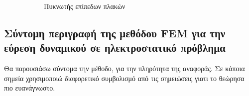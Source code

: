 \documentclass[10pt, letterpaper]{article}
\newcommand{\en}{\selectlanguage{english}}
\newcommand{\gr}{\selectlanguage{greek}}
\begin{document}
\begin{figure}[H]
\begin{subfigure}[b]{0.45\textwidth}
        \caption{Πυκνωτής επίπεδων πλακών}
        \label{fig:capacitor}
    \end{subfigure}
    \caption{}
    \label{fig:definition}
  \end{figure}


\subsection*{Σύντομη περιγραφή της μεθόδου \en FEM \gr για την εύρεση δυναμικού σε ηλεκτροστατικό πρόβλημα}

Θα παρουσιάσω σύντομα την μέθοδο, για την πληρότητα της αναφοράς. Σε κάποια σημεία χρησιμοποιώ διαφορετικό 
συμβολισμό από τις σημειώσεις γιατι το θεώρησα πιο ευανάγνωστο.
\end{document}
